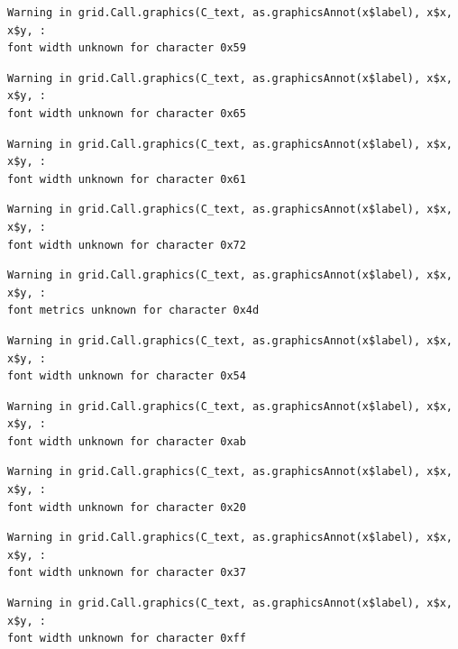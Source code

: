 \documentclass[
  letterpaper,
]{scrbook}
\begin{document}
\begin{verbatim}
Warning in grid.Call.graphics(C_text, as.graphicsAnnot(x$label), x$x, x$y, :
font width unknown for character 0x59
\end{verbatim}

\begin{verbatim}
Warning in grid.Call.graphics(C_text, as.graphicsAnnot(x$label), x$x, x$y, :
font width unknown for character 0x65
\end{verbatim}

\begin{verbatim}
Warning in grid.Call.graphics(C_text, as.graphicsAnnot(x$label), x$x, x$y, :
font width unknown for character 0x61
\end{verbatim}

\begin{verbatim}
Warning in grid.Call.graphics(C_text, as.graphicsAnnot(x$label), x$x, x$y, :
font width unknown for character 0x72
\end{verbatim}

\begin{verbatim}
Warning in grid.Call.graphics(C_text, as.graphicsAnnot(x$label), x$x, x$y, :
font metrics unknown for character 0x4d
\end{verbatim}

\begin{verbatim}
Warning in grid.Call.graphics(C_text, as.graphicsAnnot(x$label), x$x, x$y, :
font width unknown for character 0x54
\end{verbatim}

\begin{verbatim}
Warning in grid.Call.graphics(C_text, as.graphicsAnnot(x$label), x$x, x$y, :
font width unknown for character 0xab
\end{verbatim}

\begin{verbatim}
Warning in grid.Call.graphics(C_text, as.graphicsAnnot(x$label), x$x, x$y, :
font width unknown for character 0x20
\end{verbatim}

\begin{verbatim}
Warning in grid.Call.graphics(C_text, as.graphicsAnnot(x$label), x$x, x$y, :
font width unknown for character 0x37
\end{verbatim}

\begin{verbatim}
Warning in grid.Call.graphics(C_text, as.graphicsAnnot(x$label), x$x, x$y, :
font width unknown for character 0xff
\end{verbatim}
\end{document}

